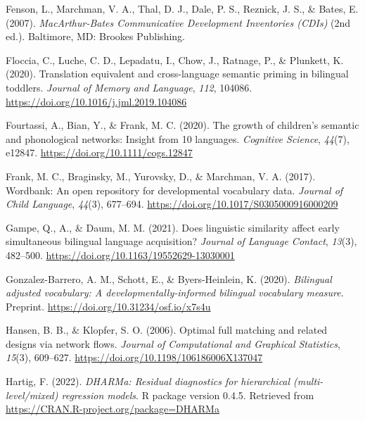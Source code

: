 \documentclass[
  ,man,floatsintext]{apa6}
\newlength{\cslhangindent}
\newlength{\cslentryspacingunit} %
\newenvironment{CSLReferences}[2] %
 {%
  \setlength{\parindent}{0pt}
  \ifodd #1
  \let\oldpar\par
  \def\par{\hangindent=\cslhangindent\oldpar}
  \fi
  \setlength{\parskip}{#2\cslentryspacingunit}
 }%
 {}
\begin{document}
\begin{CSLReferences}{1}{0}
\leavevmode{}%
Fenson, L., Marchman, V. A., Thal, D. J., Dale, P. S., Reznick, J. S., \& Bates, E. (2007). \emph{MacArthur-{B}ates {C}ommunicative {D}evelopment {I}nventories ({CDIs})} (2nd ed.). Baltimore, MD: Brookes Publishing.

\leavevmode{}%
Floccia, C., Luche, C. D., Lepadatu, I., Chow, J., Ratnage, P., \& Plunkett, K. (2020). Translation equivalent and cross-language semantic priming in bilingual toddlers. \emph{Journal of Memory and Language}, \emph{112}, 104086. \url{https://doi.org/10.1016/j.jml.2019.104086}

\leavevmode{}%
Fourtassi, A., Bian, Y., \& Frank, M. C. (2020). The growth of children's semantic and phonological networks: Insight from 10 languages. \emph{Cognitive Science}, \emph{44}(7), e12847. \url{https://doi.org/10.1111/cogs.12847}

\leavevmode{}%
Frank, M. C., Braginsky, M., Yurovsky, D., \& Marchman, V. A. (2017). Wordbank: An open repository for developmental vocabulary data. \emph{Journal of Child Language}, \emph{44}(3), 677--694. \url{https://doi.org/10.1017/S0305000916000209}

\leavevmode{}%
Gampe, Q., A., \& Daum, M. M. (2021). Does linguistic similarity affect early simultaneous bilingual language acquisition? \emph{Journal of Language Contact}, \emph{13}(3), 482--500. \url{https://doi.org/10.1163/19552629-13030001}

\leavevmode{}%
Gonzalez-Barrero, A. M., Schott, E., \& Byers-Heinlein, K. (2020). \emph{Bilingual adjusted vocabulary: A developmentally-informed bilingual vocabulary measure}. Preprint. \url{https://doi.org/10.31234/osf.io/x7s4u}

\leavevmode{}%
Hansen, B. B., \& Klopfer, S. O. (2006). Optimal full matching and related designs via network flows. \emph{Journal of Computational and Graphical Statistics}, \emph{15}(3), 609--627. \url{https://doi.org/10.1198/106186006X137047}

\leavevmode{}%
Hartig, F. (2022). \emph{DHARMa: Residual diagnostics for hierarchical (multi-level/mixed) regression models}. R package version 0.4.5. Retrieved from \url{https://CRAN.R-project.org/package=DHARMa}


\end{CSLReferences}
\end{document}
